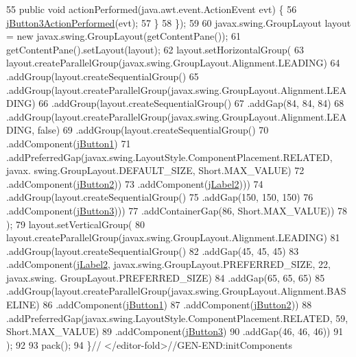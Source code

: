 \begin{DoxyCode}
55             \textcolor{keyword}{public} \textcolor{keywordtype}{void} actionPerformed(java.awt.event.ActionEvent evt) \{
56                 \mbox{\hyperlink{classejercicio2_1_1_interfaz2_a5a9fe11c8a0e571dc802502ae085bb59}{jButton3ActionPerformed}}(evt);
57             \}
58         \});
59 
60         javax.swing.GroupLayout layout = \textcolor{keyword}{new} javax.swing.GroupLayout(getContentPane());
61         getContentPane().setLayout(layout);
62         layout.setHorizontalGroup(
63             layout.createParallelGroup(javax.swing.GroupLayout.Alignment.LEADING)
64             .addGroup(layout.createSequentialGroup()
65                 .addGroup(layout.createParallelGroup(javax.swing.GroupLayout.Alignment.LEADING)
66                     .addGroup(layout.createSequentialGroup()
67                         .addGap(84, 84, 84)
68                         .addGroup(layout.createParallelGroup(javax.swing.GroupLayout.Alignment.LEADING, \textcolor{keyword}{
      false})
69                             .addGroup(layout.createSequentialGroup()
70                                 .addComponent(\mbox{\hyperlink{classejercicio2_1_1_interfaz2_a949e47628600917db7a23e8578a15ac6}{jButton1}})
71                                 .addPreferredGap(javax.swing.LayoutStyle.ComponentPlacement.RELATED, javax.
      swing.GroupLayout.DEFAULT\_SIZE, Short.MAX\_VALUE)
72                                 .addComponent(\mbox{\hyperlink{classejercicio2_1_1_interfaz2_a93c88ef914c8fc9608562eeb7332ba29}{jButton2}}))
73                             .addComponent(\mbox{\hyperlink{classejercicio2_1_1_interfaz2_afed2016c320d66b58d4790add9b28196}{jLabel2}})))
74                     .addGroup(layout.createSequentialGroup()
75                         .addGap(150, 150, 150)
76                         .addComponent(\mbox{\hyperlink{classejercicio2_1_1_interfaz2_a777b07babdd7af4ba93aeb3046529a34}{jButton3}})))
77                 .addContainerGap(86, Short.MAX\_VALUE))
78         );
79         layout.setVerticalGroup(
80             layout.createParallelGroup(javax.swing.GroupLayout.Alignment.LEADING)
81             .addGroup(layout.createSequentialGroup()
82                 .addGap(45, 45, 45)
83                 .addComponent(\mbox{\hyperlink{classejercicio2_1_1_interfaz2_afed2016c320d66b58d4790add9b28196}{jLabel2}}, javax.swing.GroupLayout.PREFERRED\_SIZE, 22, javax.swing.
      GroupLayout.PREFERRED\_SIZE)
84                 .addGap(65, 65, 65)
85                 .addGroup(layout.createParallelGroup(javax.swing.GroupLayout.Alignment.BASELINE)
86                     .addComponent(\mbox{\hyperlink{classejercicio2_1_1_interfaz2_a949e47628600917db7a23e8578a15ac6}{jButton1}})
87                     .addComponent(\mbox{\hyperlink{classejercicio2_1_1_interfaz2_a93c88ef914c8fc9608562eeb7332ba29}{jButton2}}))
88                 .addPreferredGap(javax.swing.LayoutStyle.ComponentPlacement.RELATED, 59, Short.MAX\_VALUE)
89                 .addComponent(\mbox{\hyperlink{classejercicio2_1_1_interfaz2_a777b07babdd7af4ba93aeb3046529a34}{jButton3}})
90                 .addGap(46, 46, 46))
91         );
92 
93         pack();
94     \}\textcolor{comment}{// </editor-fold>//GEN-END:initComponents}
\end{DoxyCode}
